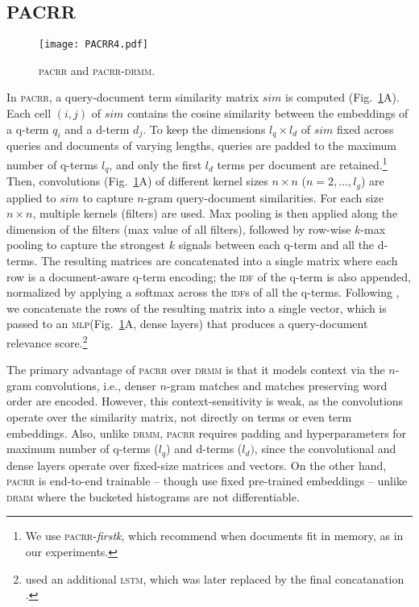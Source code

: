 \documentclass[11pt,a4paper]{article}
\newcommand{\mlp}{\textsc{mlp}\xspace}
\newcommand{\lstm}{\textsc{lstm}\xspace}
\newcommand{\drmm}{\textsc{drmm}\xspace}
\newcommand{\pacrr}{\textsc{pacrr}\xspace}
\newcommand{\pacrrdrmm}{\textsc{pacrr-drmm}\xspace}
\newcommand{\idf}{\textsc{idf}\xspace}
\begin{document}
\subsection{PACRR}
\label{sec:pacrr}

\begin{figure}[t]
\texttt{[image: PACRR4.pdf]}
\vspace{-0.17in}
\caption{\pacrr \cite{hui2017pacrr} and \pacrrdrmm.}
\vspace{-4mm}
\label{fig:pacrr}
\end{figure}

In \pacrr \cite{hui2017pacrr}, a query-document term similarity matrix 
$\textit{sim}$ is computed (Fig.~\ref{fig:pacrr}A). Each cell $(i, j)$ of 
$\textit{sim}$ contains the cosine similarity between the embeddings of a
q-term $q_i$ and a d-term $d_j$. 
To keep the dimensions $l_q \times l_d$ of 
$\textit{sim}$ fixed across queries and documents of varying lengths, queries are padded to the maximum number of 
q-terms $l_q$, and only 
the first $l_d$ terms per document are retained.\footnote{We use \textsc{pacrr}-\textit{firstk}, which 
 recommend when documents fit in memory, as in our experiments.}
Then, convolutions (Fig.~\ref{fig:pacrr}A) of different kernel sizes $n\times n$ ($n=2,\dots,l_g$) are applied to 
$\textit{sim}$ to capture $n$-gram query-document similarities. For each size  $n\times n$, multiple kernels (filters) are used. Max pooling is then applied along the dimension of the filters (max value of all filters), 
followed by row-wise $k$-max pooling to capture the strongest $k$ signals between each 
q-term and all the d-terms. 
The resulting matrices are concatenated into a single matrix where each row is a 
document-aware q-term encoding; the \idf of the q-term is also appended, normalized by applying a softmax across the \idf{s} of all the q-terms.
Following , we concatenate the rows of the resulting matrix into a single vector, which is passed to an \mlp (Fig.~\ref{fig:pacrr}A, dense layers) that produces a query-document relevance score.\footnote{ used an additional \lstm, which was later replaced by the final concatanation \cite{hui2018copacrr}.}

The primary advantage of \pacrr over \drmm is that it models context via the $n$-gram convolutions, i.e., denser $n$-gram matches and matches preserving word order are encoded. However, this context-sensitivity is weak, as the convolutions operate over the similarity matrix, not directly on terms or even term embeddings. Also, unlike \drmm, \pacrr requires padding and hyperparameters for maximum number of q-terms ($l_q$) and d-terms ($l_d)$, since 
the convolutional and dense layers operate over fixed-size matrices and vectors.
On the other hand, \pacrr is end-to-end trainable -- though  use fixed pre-trained embeddings -- unlike \drmm where the bucketed histograms are not differentiable. 
\end{document}
